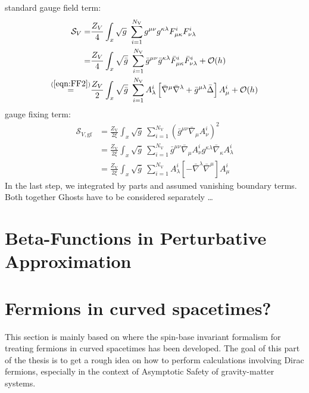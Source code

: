 standard gauge field term:
\begin{align}
\mathcal{S}_{V} =  &\frac{Z_V}{4}\int_x \sqrt{g} \ \sum\limits_{i=1}^{N_{\text{V}}} g^{\mu\nu}g^{\kappa\lambda}F^{i}_{\mu\kappa}F^{i}_{\nu\lambda} \nonumber \\
=  &\frac{Z_{V}}{4}\int_x \sqrt{\bar{g}} \ \sum\limits_{i=1}^{N_{\text{V}}} \bar{g}^{\mu\nu}\bar{g}^{\kappa\lambda}\bar{F}^{i}_{\mu\kappa}\bar{F}^{i}_{\nu\lambda} + \mathcal{O}(h) \\
\overset{(\mathrm{\ref{eqn:FF2}})}{=} &\frac{Z_{V}}{2}\int_x \sqrt{\bar{g}} \ \sum\limits_{i=1}^{N_{\text{V}}} A_{\lambda}^{i}\left[ \bar{\nabla}^{\mu}\bar{\nabla}^{\lambda} + \bar{g}^{\mu\lambda}\bar{\Delta}\right]A_{\mu}^{i} + \mathcal{O}(h) \nonumber
\end{align}
gauge fixing term:
\begin{align}
	\mathcal{S}_{V, \mathrm{gf}} &= \frac{Z_{\text{V}}}{2\xi}\int_x \sqrt{\bar{g}} \ \sum\limits_{i=1}^{N_{\text{V}}} \left(\bar{g}^{\mu\nu}\bar{\nabla}_{\mu}A_{\nu}^{i}\right)^2  \nonumber\\
	&= \frac{Z_{\text{V}}}{2\xi}\int_x \sqrt{\bar{g}} \ \sum\limits_{i=1}^{N_{\text{V}}} \bar{g}^{\mu\nu}\bar{\nabla}_{\mu}A_{\nu}^{i}g^{\kappa\lambda}\bar{\nabla}_{\kappa}A_{\lambda}^{i} \\
	&= \frac{Z_{\text{V}}}{2\xi}\int_x \sqrt{\bar{g}} \ \sum\limits_{i=1}^{N_{\text{V}}} A_{\lambda}^{i}\left[-\bar{\nabla}^{\lambda}\bar{\nabla}^{\mu}\right]A_{\mu}^{i} \nonumber
\end{align}
In the last step, we integrated by parts and assumed vanishing boundary terms. \\
Both together 
Ghosts have to be considered separately \dots


\section{Beta-Functions in Perturbative Approximation}

\section{Fermions in curved spacetimes?}
This section is mainly based on \cite{LippoldtPHD}  where the spin-base invariant formalism for treating fermions in curved spacetimes has been developed. The goal of this part of the thesis is to get a rough idea on how to perform calculations involving Dirac fermions, especially in the context of Asymptotic Safety of gravity-matter systems.  

